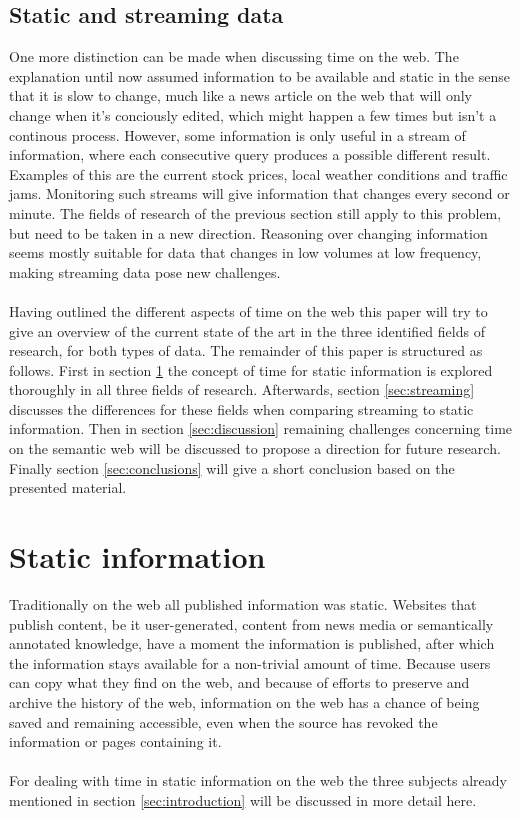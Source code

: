\documentclass{llncs}
\begin{document}
\subsection{Static and streaming data}
One more distinction can be made when discussing time on the web. The explanation until now assumed information to be available and static in the sense that it is slow to change, much like a news article on the web that will only change when it's conciously edited, which might happen a few times but isn't a continous process. However, some information is only useful in a stream of information, where each consecutive query produces a possible different result. Examples of this are the current stock prices, local weather conditions and traffic jams. Monitoring such streams will give information that changes every second or minute. The fields of research of the previous section still apply to this problem, but need to be taken in a new direction. Reasoning over changing information seems mostly suitable for data that changes in low volumes at low frequency, making streaming data pose new challenges.\\
\\
Having outlined the different aspects of time on the web this paper will try to give an overview of the current state of the art in the three identified fields of research, for both types of data. The remainder of this paper is structured as follows. First in section \ref{sec:static} the concept of time for static information is explored thoroughly in all three fields of research. Afterwards, section \ref{sec:streaming} discusses the differences for these fields when comparing streaming to static information. Then in section \ref{sec:discussion} remaining challenges concerning time on the semantic web will be discussed to propose a direction for future research. Finally section \ref{sec:conclusions} will give a short conclusion based on the presented material.


\section{Static information}
\label{sec:static}

Traditionally on the web all published information was static. Websites that publish content, be it user-generated, content from news media or semantically annotated knowledge, have a moment the information is published, after which the information stays available for a non-trivial amount of time. Because users can copy what they find on the web, and because of efforts to preserve and archive the history of the web, information on the web has a chance of being saved and remaining accessible, even when the source has revoked the information or pages containing it.\\
\\
For dealing with time in static information on the web the three subjects already mentioned in section \ref{sec:introduction} will be discussed in more detail here.
\end{document}
